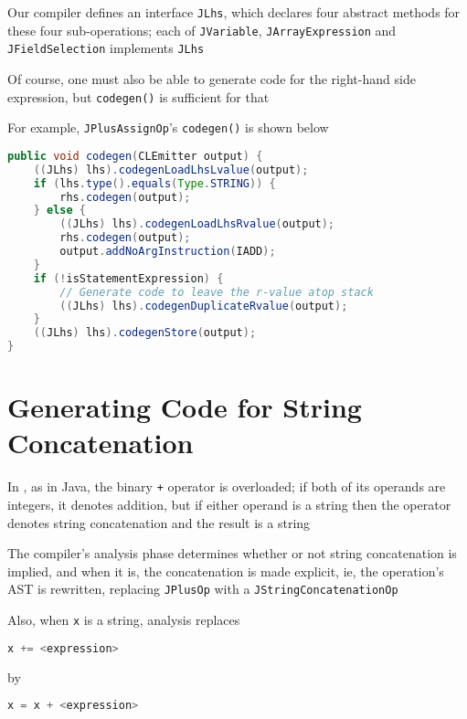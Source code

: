 \documentclass[8pt,a4paper,compress]{beamer}
\begin{document}
\begin{frame}[fragile]
\pause

Our compiler defines an interface \lstinline{JLhs}, which declares four abstract methods for these four sub-operations; each of \lstinline{JVariable}, \lstinline{JArrayExpression} and \lstinline{JFieldSelection} implements \lstinline{JLhs}

\pause
\bigskip

Of course, one must also be able to generate code for the right-hand side expression, but \lstinline{codegen()} is sufficient for that

\pause
\bigskip

For example, \lstinline{JPlusAssignOp}'s \lstinline{codegen()} is shown below
\begin{lstlisting}[language=Java,style=focusin]
public void codegen(CLEmitter output) {
    ((JLhs) lhs).codegenLoadLhsLvalue(output);
    if (lhs.type().equals(Type.STRING)) {
        rhs.codegen(output);
    } else {
        ((JLhs) lhs).codegenLoadLhsRvalue(output);
        rhs.codegen(output);
        output.addNoArgInstruction(IADD);
    }
    if (!isStatementExpression) {
        // Generate code to leave the r-value atop stack
        ((JLhs) lhs).codegenDuplicateRvalue(output);
    }
    ((JLhs) lhs).codegenStore(output);
}
\end{lstlisting}
\end{frame}

\section{Generating Code for String Concatenation}
\begin{frame}[fragile]
\pause

In \jmm, as in Java, the binary \lstinline{+} operator is overloaded; if both of its operands are integers, it denotes addition, but if either operand is a string then the operator denotes string concatenation and the result is a string

\pause
\bigskip

The compiler's analysis phase determines whether or not string concatenation is implied, and when it is, the concatenation is made explicit, ie, the operation's AST is rewritten, replacing \lstinline{JPlusOp} with a \lstinline{JStringConcatenationOp}

\pause
\bigskip

Also, when \lstinline{x} is a string, analysis replaces
\begin{lstlisting}[language=Java]
x += <expression>
\end{lstlisting}
by
\begin{lstlisting}[language=Java]
x = x + <expression>
\end{lstlisting}
\end{frame}
\end{document}
